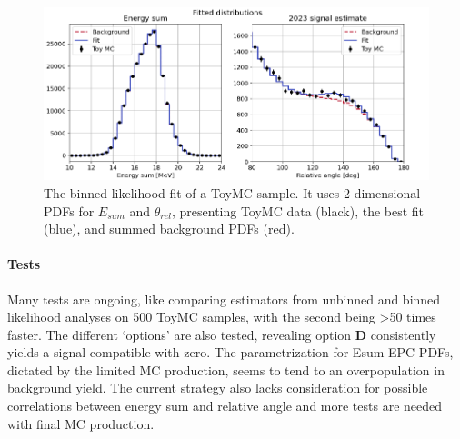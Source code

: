 \begin{refsection}
        \begin{figure}
            \centering
            \includegraphics[width=0.9\linewidth]{Figures//X17//Likelihood/examples-binned.png}
            \caption{The binned likelihood fit of a ToyMC sample. It uses 2-dimensional PDFs for $E_{sum}$ and $\theta_{rel}$, presenting ToyMC data (black), the best fit (blue), and summed background PDFs (red).}
            \label{fig:X17:binnedexample}
        \end{figure}
        
\paragraph{Tests}
Many tests are ongoing, like comparing estimators from unbinned and binned likelihood analyses on 500 ToyMC samples, with the second being >50 times faster. 
The different `options' are also tested, revealing option \textbf{D} consistently yields a signal compatible with zero. 
The parametrization for Esum EPC PDFs, dictated by the limited MC production, seems to tend to an overpopulation in background yield. 
The current strategy also lacks consideration for possible correlations between energy sum and relative angle and more tests are needed with final MC production. 


\end{refsection}
